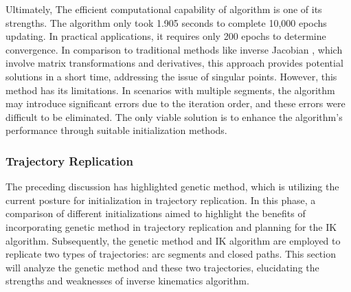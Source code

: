 Ultimately, The efficient computational capability of algorithm is one of its strengths. The algorithm only 
took 1.905 seconds to complete 10,000 epochs updating. In practical applications, it requires only 200 epochs 
to determine convergence. In comparison to traditional methods like inverse Jacobian \cite{inverse_jacobian}, 
which involve matrix transformations and derivatives, this approach provides potential solutions in a short 
time, addressing the issue of singular points. However, this method has its limitations. In scenarios with 
multiple segments, the algorithm may introduce significant errors due to the iteration order, and these errors 
were difficult to be eliminated. The only viable solution is to enhance the algorithm's performance through 
suitable initialization methods.
\subsubsection{Trajectory Replication}
The preceding discussion has highlighted genetic method, which is utilizing the current posture for 
initialization in trajectory replication. In this phase, a comparison of different initializations aimed to 
highlight the benefits of incorporating genetic method in trajectory replication and planning for the IK 
algorithm. Subsequently, the genetic method and IK algorithm are employed to 
replicate two types of trajectories: arc segments and closed paths. This section will analyze the genetic 
method and these two trajectories, elucidating the strengths and weaknesses of inverse kinematics algorithm. 

